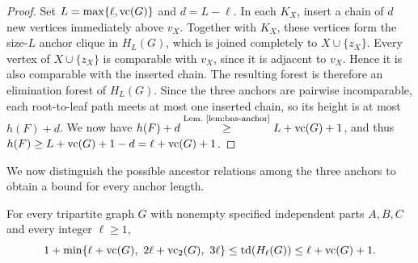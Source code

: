 \begin{proof}
Set $L=\max\{\ell,\operatorname{vc}(G)\}$ and
$d=L-\ell$. In each $K_X$, insert a chain of $d$ new vertices
immediately above $v_X$. Together with $K_X$, these vertices form
the size-$L$ anchor clique in $H_L(G)$, which is joined completely
to $X\cup\{z_X\}$. Every vertex of $X\cup\{z_X\}$ is comparable
with $v_X$, since it is adjacent to $v_X$. Hence it is
also comparable with the inserted chain. The resulting forest is
therefore an elimination forest of $H_L(G)$. Since the three
anchors are pairwise incomparable, each root-to-leaf path meets
at most one inserted chain, so its height is at most $h(F)+d$.
We now have
$h(F)+d\overset{\text{Lem.~\ref{lem:bns-anchor}}}{\ge}L+\operatorname{vc}(G)+1$, and thus
$h(F)\ge L+\operatorname{vc}(G)+1-d=\ell+\operatorname{vc}(G)+1$.
\end{proof}

We now distinguish the possible ancestor relations among the three
anchors to obtain a bound for every anchor length.

\begin{lemma}
\label{lem:arbitrary-anchor}
For every tripartite graph $G$ with nonempty specified independent
parts $A,B,C$ and every integer $\ell\ge1$,
\[
 1+\min\{\ell+\vc(G),\ 2\ell+\vc_2(G),\ 3\ell\}
 \le\td(H_\ell(G))\le\ell+\vc(G)+1.
\]
\end{lemma}

